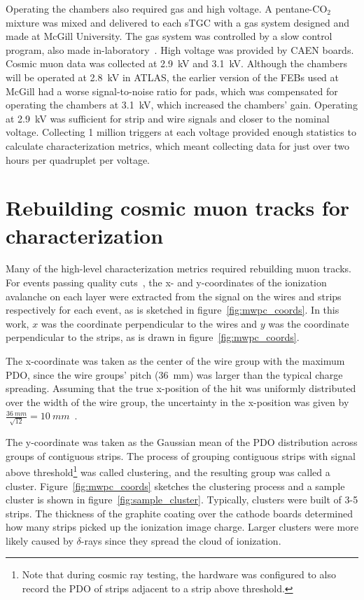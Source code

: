 Operating the chambers also required gas and high voltage. A pentane-CO$_{2}$ mixture was mixed and delivered to each sTGC with a gas system designed and made at McGill University. The gas system was controlled by a slow control program, also made in-laboratory~\cite{keyes_development_2017}. High voltage was provided by CAEN boards. Cosmic muon data was collected at 2.9~kV and 3.1~kV. Although the chambers will be operated at 2.8~kV in ATLAS, the earlier version of the FEBs used at McGill had a worse signal-to-noise ratio for pads, which was compensated for operating the chambers at 3.1~kV, which increased the chambers' gain. Operating at 2.9~kV was sufficient for strip and wire signals and closer to the nominal voltage. Collecting 1 million triggers at each voltage provided enough statistics to calculate characterization metrics, which meant collecting data for just over two hours per quadruplet per voltage.

\section{Rebuilding cosmic muon tracks for characterization}

Many of the high-level characterization metrics required rebuilding muon tracks. For events passing quality cuts~\cite{lefebvre_tgc_analysis}, the x- and y-coordinates of the ionization avalanche on each layer were extracted from the signal on the wires and strips respectively for each event, as is sketched in figure~\ref{fig:mwpc_coords}. In this work, $x$ was the coordinate perpendicular to the wires and $y$ was the coordinate perpendicular to the strips, as is drawn in figure~\ref{fig:mwpc_coords}.

The x-coordinate was taken as the center of the wire group with the maximum PDO, since the wire groups' pitch (\SI{36}{\milli\meter}) was larger than the typical charge spreading. Assuming that the true x-position of the hit was uniformly distributed over the width of the wire group, the uncertainty in the x-position was given by $\frac{36~mm}{\sqrt{12}} = 10~mm$~\cite{Sauli:117989}.

The y-coordinate was taken as the Gaussian mean of the PDO distribution across groups of contiguous strips. The process of grouping contiguous strips with signal above threshold\footnote{Note that during cosmic ray testing, the hardware was configured to also record the PDO of strips adjacent to a strip above threshold.} was called clustering, and the resulting group was called a cluster. Figure~\ref{fig:mwpc_coords} sketches the clustering process and a sample cluster is shown in figure~\ref{fig:sample_cluster}. Typically, clusters were built of 3-5 strips. The thickness of the graphite coating over the cathode boards determined how many strips picked up the ionization image charge. Larger clusters were more likely caused by $\delta$-rays since they spread the cloud of ionization. 

